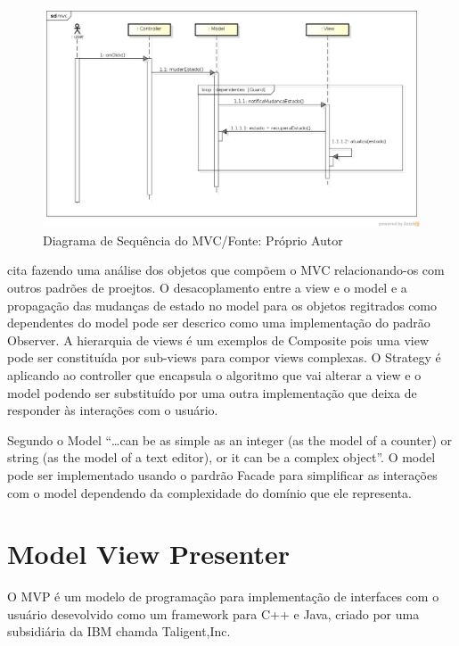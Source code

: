 \begin{figure}[h]
	\centering
	\includegraphics[scale=0.5]{img/mvc_seq.png}
	\caption{Diagrama de Sequência do MVC/Fonte: Próprio Autor}
	\label{mvc_seq}
\end{figure}

 cita  fazendo uma análise dos
objetos que compõem o MVC relacionando-os com outros padrões de proejtos. O
desacoplamento entre a view e o model e a propagação das mudanças de estado no
model para os objetos regitrados como dependentes do model pode ser descrico
como uma implementação do padrão Observer. A hierarquia de views é um exemplos
de Composite pois uma view pode ser constituída por sub-views para compor views
complexas. O Strategy é aplicando ao controller que encapsula o algoritmo que
vai alterar a view e o model podendo ser substituído por uma outra
implementação que deixa de responder às interações com o usuário.

Segundo  o Model ``\ldots can be as simple as an integer
(as the model of a counter) or string (as the model of a text editor), or it can
be a complex object''. O model pode ser implementado usando o pardrão Facade
para simplificar as interações com o model dependendo da complexidade do
domínio que ele representa.



\section{Model View Presenter}

O MVP é um modelo de programação para implementação de interfaces com o usuário
desevolvido como um framework para C++ e Java, criado por uma subsidiária da IBM
chamda Taligent,Inc. 

